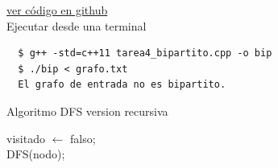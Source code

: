 \documentclass{article}
\begin{document}
\href{https://github.com/luisballado/ADA/blob/main/practice_code/tarea4_bipartito.cpp}{ver código en github}\\

Ejecutar desde una terminal

\begin{commandline}
\begin{verbatim}
  $ g++ -std=c++11 tarea4_bipartito.cpp -o bip
  $ ./bip < grafo.txt
  El grafo de entrada no es bipartito.
\end{verbatim}
\end{commandline}

\begin{center}
  \begin{minipage}{0.7\linewidth} %
    \begin{algorithm}[H] 
      \SetAlgoLined
      \DontPrintSemicolon
      \caption{Algoritmo DFS version recursiva}
      \label{alg:loop}
      visitado $\leftarrow$ {falso};\\
      DFS(nodo);\\
    \end{algorithm}
  \end{minipage}
\end{center}
\end{document}
